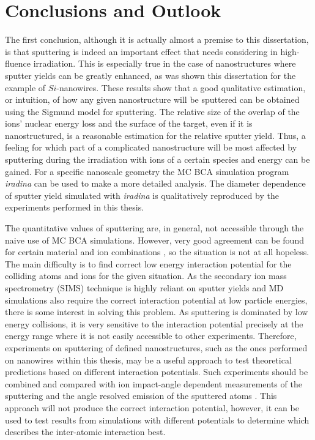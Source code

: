 \chapter{Conclusions and Outlook}

The first conclusion, although it is actually almost a premise to this dissertation, is that sputtering is indeed an important effect that needs considering in high-fluence irradiation. This is especially true in the case of nanostructures where sputter yields can be greatly enhanced, as was shown this dissertation for the example of $Si$-nanowires. These results show that a good qualitative estimation, or intuition, of how any given nanostructure will be sputtered can be obtained using the Sigmund model for sputtering. The relative size of the overlap of the ions' nuclear energy loss and the surface of the target, even if it is nanostructured, is a reasonable estimation for the relative sputter yield. Thus, a feeling for which part of a complicated nanostructure will be most affected by sputtering during the irradiation with ions of a certain species and energy can be gained. For a specific nanoscale geometry the MC BCA simulation program \emph{iradina} \cite{borschel_ion_2011} can be used to make a more detailed analysis. The diameter dependence of sputter yield simulated with \emph{iradina} is qualitatively reproduced by the experiments performed in this thesis.

The quantitative values of sputtering are, in general, not accessible through the naive use of MC BCA simulations. However, very good agreement can be found for certain material and ion combinations \cite{biersack_computer_1987,hofsass_simulation_2014}, so the situation is not at all hopeless. The main difficulty is to find correct low energy interaction potential for the colliding atoms and ions for the given situation. As the secondary ion mass spectrometry (SIMS) technique is highly reliant on sputter yields and MD simulations also require the correct interaction potential at low particle energies, there is some interest in solving this problem. As sputtering is dominated by low energy collisions, it is very sensitive to the interaction potential precisely at the energy range where it is not easily accessible to other experiments. Therefore, experiments on sputtering of defined nanostructures, such as the ones performed on nanowires within this thesis, may be a useful approach to test theoretical predictions based on different interaction potentials. Such experiments should be combined and compared with ion impact-angle dependent measurements of the sputtering \cite{hofsass_simulation_2014} and the angle resolved emission of the sputtered atoms \cite{wirtz_storing_2008,verdeil_angular_2008}. This approach will not produce the correct interaction potential, however, it can be used to test results from simulations with different potentials to determine which describes the inter-atomic interaction best.

